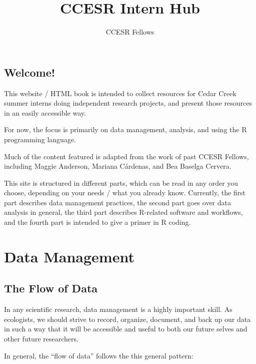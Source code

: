 \documentclass[
  letterpaper,
  DIV=11,
  numbers=noendperiod]{scrreprt}
\title{CCESR Intern Hub}
\author{CCESR Fellows}
\date{}
\renewcommand*\contentsname{Table of contents}
\newcommand\contentsname{Table of contents}
\begin{document}
\maketitle

\renewcommand*\contentsname{Table of contents}
{
\hypersetup{linkcolor=}
\setcounter{tocdepth}{2}
\tableofcontents
}

\chapter*{Welcome!}\label{welcome}


This website / HTML book is intended to collect resources for Cedar
Creek summer interns doing independent research projects, and present
those resources in an easily accessible way.

For now, the focus is primarily on data management, analysis, and using
the R programming language.

Much of the content featured is adapted from the work of past CCESR
Fellows, including Maggie Anderson, Mariana Cárdenas, and Bea Baselga
Cervera.

This site is structured in different parts, which can be read in any
order you choose, depending on your needs / what you already know.
Currently, the first part describes data management practices, the
second part goes over data analysis in general, the third part describes
R-related software and workflows, and the fourth part is intended to
give a primer in R coding.

\part{Data Management}

\chapter{The Flow of Data}\label{the-flow-of-data}

In any scientific research, data management is a highly important skill.
As ecologists, we should strive to record, organize, document, and back
up our data in such a way that it will be accessible and useful to both
our future selves and other future researchers.

In general, the ``flow of data'' follows the this general pattern:
\end{document}
